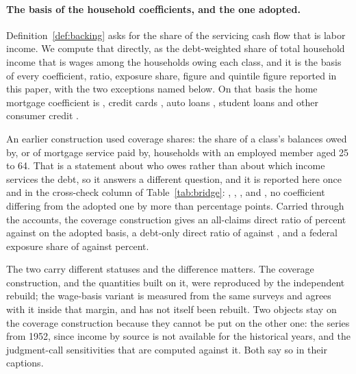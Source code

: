 {\footnotesize
}

\paragraph{The basis of the household coefficients, and the one adopted.}
Definition~\ref{def:backing} asks for the share of the servicing cash flow that is labor income.
We compute that directly, as the debt-weighted share of total household income that is wages among
the households owing each class, and it is the basis of every coefficient, ratio, exposure share,
figure and quintile figure reported in this paper, with the two exceptions named below. On that
basis the home mortgage coefficient is , credit cards
, auto loans , student loans
 and other consumer credit .

An earlier construction used coverage shares: the share of a class's balances owed by, or of
mortgage service paid by, households with an employed member aged 25 to 64. That is a statement
about who owes rather than about which income services the debt, so it answers a different
question, and it is reported here once and in the cross-check column of
Table~\ref{tab:bridge}: , ,
,  and , no
coefficient differing from the adopted one by more than  percentage
points. Carried through the accounts, the coverage construction gives an all-claims direct ratio
of  percent against  on the adopted basis,
a debt-only direct ratio of  against
, and a federal exposure share of
 against  percent.

The two carry different statuses and the difference matters. The coverage construction, and the
quantities built on it, were reproduced by the independent rebuild; the wage-basis variant is
measured from the same surveys and agrees with it inside that margin, and has not itself been
rebuilt. Two objects stay on the coverage construction because they cannot be put on the other
one: the series from 1952, since income by source is not available for the historical years, and
the judgment-call sensitivities that are computed against it. Both say so in their captions.

